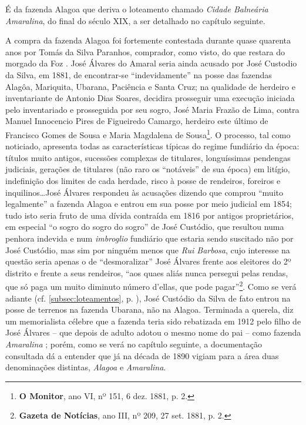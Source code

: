 É da fazenda Alagoa que deriva o loteamento chamado \textit{Cidade Balneária Amaralina}, do final do século XIX, a ser detalhado no capítulo seguinte.

A compra da fazenda Alagoa foi fortemente contestada durante quase quarenta anos por Tomás da Silva Paranhos, comprador, como visto, do que restara do morgado da Foz \cite[p.~118]{campos_alagoa_1942}. José Álvares do Amaral seria ainda acusado por José Custodio da Silva, em 1881, de encontrar-se ``indevidamente'' na posse das fazendas Alagôa, Mariquita, Ubarana, Paciência e Santa Cruz; na qualidade de herdeiro e inventariante de Antonio Dias Soares, decidira prosseguir uma execução iniciada pelo inventariado e prosseguida por seu sogro, José Maria Frazão de Lima, contra Manuel Innocencio Pires de Figueiredo Camargo, herdeiro este último de Francisco Gomes de Sousa e Maria Magdalena de Sousa\footnote{\textbf{O Monitor}, ano VI, nº 151, 6 dez. 1881, p. 2.}. O processo, tal como noticiado, apresenta todas as características típicas do regime fundiário da época: títulos muito antigos, sucessões complexas de titulares, longuíssimas pendengas judiciais, gerações de titulares (não raro os ``notáveis'' de sua época) em litígio, indefinição dos limites de cada herdade, risco à posse de rendeiros, foreiros e inquilinos\dots José Álvares respondeu às acusações dizendo que comprou ``muito legalmente'' a fazenda Alagoa e entrou em sua posse por meio judicial em 1854; tudo isto seria fruto de uma dívida contraída em 1816 por antigos proprietários, em especial ``o sogro do sogro do sogro'' de José Custódio, que resultou numa penhora indevida e num \textit{imbroglio} fundiário que estaria sendo suscitado não por José Custódio, mas sim por ninguém menos que \textit{Rui Barbosa}, cujo interesse na questão seria apenas o de ``desmoralizar'' José Álvares frente aos eleitores do 2º distrito e frente a seus rendeiros, ``aos quaes aliás nunca persegui pelas rendas, que só paga um muito diminuto número d'ellas, que pode pagar''\footnote{\textbf{Gazeta de Notícias}, ano III, nº 209, 27 set. 1881, p. 2.}. Como se verá adiante (cf. \autoref{subsec:loteamentos}, p. \pageref{subsec:loteamentos}), José Custódio da Silva de fato entrou na posse de terrenos na fazenda Ubarana, não na Alagoa. Terminada a querela, diz um memorialista célebre que a fazenda teria sido rebatizada em 1912 pelo filho de José Álvares -- que depois de adulto adotou o mesmo nome do pai -- como fazenda \textit{Amaralina} \cite[p.~118]{campos_alagoa_1942}; porém, como se verá no capítulo seguinte, a documentação consultada dá a entender que já na década de 1890 vigiam para a área duas denominações distintas, \textit{Alagoa} e \textit{Amaralina}.

